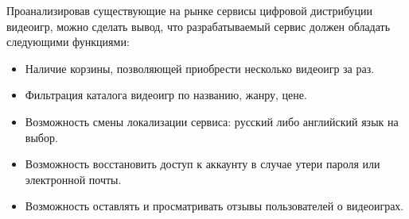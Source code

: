 Проанализировав существующие на рынке сервисы цифровой дистрибуции видеоигр, можно сделать вывод, что разрабатываемый сервис должен обладать следующими функциями:
\begin{itemize}
	\item Наличие корзины, позволяющей приобрести несколько видеоигр за раз.
	\item Фильтрация каталога видеоигр по названию, жанру, цене.
	\item Возможность смены локализации сервиса: русский либо английский язык на выбор.
	\item Возможность восстановить доступ к аккаунту в случае утери пароля или электронной почты.
	\item Возможность оставлять и просматривать отзывы пользователей о видеоиграх.
\end{itemize} 
